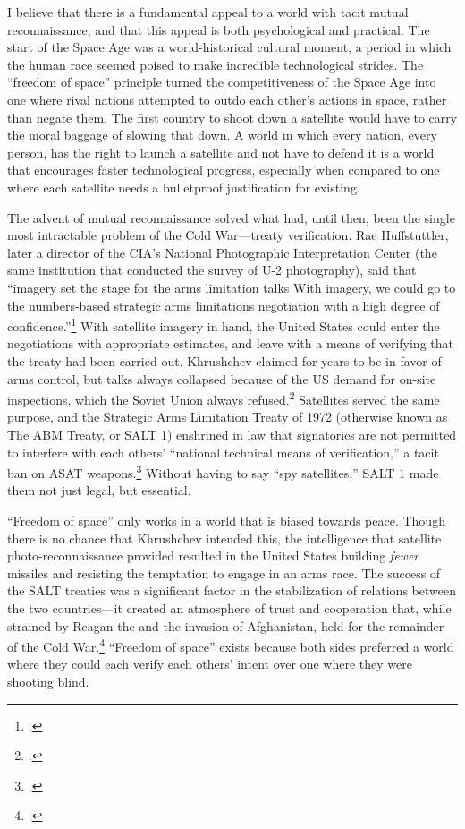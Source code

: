 \documentclass{memoir}
\begin{document}
I believe that there is a fundamental appeal to a world with tacit mutual reconnaissance, and that this appeal is both psychological and practical. The start of the Space Age was a world-historical cultural moment, a period in which the human race seemed poised to make incredible technological strides. The ``freedom of space'' principle turned the competitiveness of the Space Age into one where rival nations attempted to outdo each other's actions in space, rather than negate them. The first country to shoot down a satellite would have to carry the moral baggage of slowing that down. A world in which every nation, every person, has the right to launch a satellite and not have to defend it is a world that encourages faster technological progress, especially when compared to one where each satellite needs a bulletproof justification for existing.

The advent of mutual reconnaissance solved what had, until then, been the single most intractable problem of the Cold War---treaty verification. Rae Huffstuttler, later a director of the CIA's National Photographic Interpretation Center (the same institution that conducted the survey of U-2 photography), said that ``imagery set the stage for the arms limitation talks \textelp{} With imagery, we could go to the numbers-based strategic arms limitations negotiation with a high degree of confidence.''\footcite[p.~403]{brugioni_eyes_2010} With satellite imagery in hand, the United States could enter the negotiations with appropriate estimates, and leave with a means of verifying that the treaty had been carried out. Khrushchev claimed for years to be in favor of arms control, but talks always collapsed because of the US demand for on-site inspections, which the Soviet Union always refused.\footcite[p.~255]{mcdougall_heavens_1985} Satellites served the same purpose, and the Strategic Arms Limitation Treaty of 1972 (otherwise known as The ABM Treaty, or SALT 1) enshrined in law that signatories are not permitted to interfere with each others' ``national technical means of verification,'' a tacit ban on ASAT weapons.\footcite[p.~431]{mcdougall_heavens_1985} Without having to say ``spy satellites,'' SALT 1 made them not just legal, but essential.

``Freedom of space'' only works in a world that is biased towards peace. Though there is no chance that Khrushchev intended this, the intelligence that satellite photo-reconnaissance provided resulted in the United States building \emph{fewer} missiles and resisting the temptation to engage in an arms race. The success of the SALT treaties was a significant factor in the stabilization of relations between the two countries---it created an atmosphere of trust and cooperation that, while strained by Reagan the and the invasion of Afghanistan, held for the remainder of the Cold War.\footcite[p.~179]{lindgren_trust_2000} ``Freedom of space'' exists because both sides preferred a world where they could each verify each others' intent over one where they were shooting blind.
\end{document}
